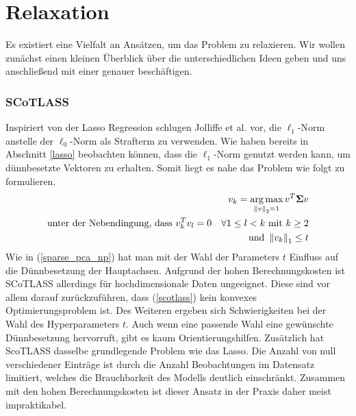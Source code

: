 

\section{Relaxation}
\label{relaxation}

Es existiert eine Vielfalt an Ansätzen, um das Problem zu relaxieren. Wir wollen zunächst einen kleinen Überblick über die unterschiedlichen Ideen geben und uns anschließend mit einer genauer beschäftigen. 

\subsubsection{SCoTLASS}

Inspiriert von der Lasso Regression \cite{tibshirani_lasso} schlugen Jolliffe et al. \cite{scotlass} vor, die $\ell_1$-Norm anstelle der $\ell_0$-Norm als Strafterm zu verwenden. Wie haben bereits in Abschnitt \ref{lasso} beobachten können, dass die $\ell_1$-Norm genutzt werden kann, um dünnbesetzte Vektoren zu erhalten. Somit liegt es nahe das Problem wie folgt zu formulieren.
\begin{gather}
\label{scotlass}
\begin{split}
v_{k} = \operatorname*{arg\,max}_{\left\lVert v \right\rVert_2 = 1} v^{T}\mathbf{\Sigma} v\\
\text{unter der Nebendingung, dass } v_{k}^Tv_{l} = 0 \quad \forall 1 \leq l < k \text{ mit } k\geq 2\\
\text{und } \left\lVert v_{k} \right\rVert_1 \leq t 
\end{split}
\end{gather}
Wie in (\ref{sparse_pca_np}) hat man mit der Wahl der Parameters $t$ Einfluss auf die Dünnbesetzung der Hauptachsen. Aufgrund der hohen Berechnungskosten ist SCoTLASS allerdings für hochdimensionale Daten ungeeignet. Diese sind vor allem darauf zurückzuführen, dass (\ref{scotlass}) kein konvexes Optimierungsproblem ist. Des Weiteren ergeben sich Schwierigkeiten bei der Wahl des Hyperparameters $t$. Auch wenn eine passende Wahl eine gewünschte Dünnbesetzung hervorruft, gibt es kaum Orientierungshilfen. Zusätzlich hat ScoTLASS dasselbe grundlegende Problem wie das Lasso. Die Anzahl von null verschiedener Einträge ist durch die Anzahl Beobachtungen im Datensatz limitiert, welches die Brauchbarkeit des Modells deutlich einschränkt. Zusammen mit den hohen Berechnungskosten ist dieser Ansatz in der Praxis daher meist impraktikabel.

